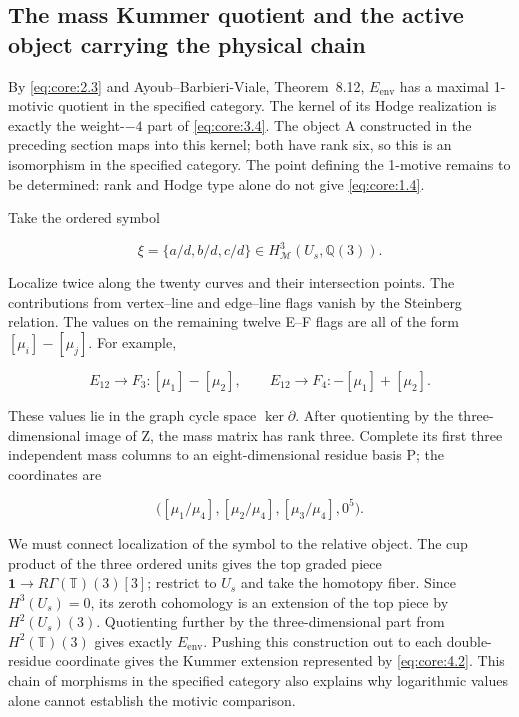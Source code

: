 \documentclass[11pt,a4paper,oneside]{article}
\theoremstyle{plain}
\theoremstyle{definition}
\theoremstyle{remark}
\numberwithin{equation}{section}
\begin{document}
\subsection{The mass Kummer quotient and the active object carrying the physical chain}\label{sec:core:4}

By \eqref{eq:core:2.3} and Ayoub--Barbieri-Viale, Theorem~8.12, \(E_{\mathrm{env}}\) has a maximal 1-motivic quotient in the specified category. The kernel of its Hodge realization is exactly the weight-\(- 4\) part of \eqref{eq:core:3.4}. The object A constructed in the preceding section maps into this kernel; both have rank six, so this is an isomorphism in the specified category. The point defining the 1-motive remains to be determined: rank and Hodge type alone do not give \eqref{eq:core:1.4}.

Take the ordered symbol

\begin{equation}
\xi=\{a/d,b/d,c/d\}\in H^3_{\mathcal M}(U_s,\mathbb Q(3)).
\end{equation}

Localize twice along the twenty curves and their intersection points. The contributions from vertex--line and edge--line flags vanish by the Steinberg relation. The values on the remaining twelve E--F flags are all of the form \([\mu_i]-[\mu_j]\). For example,

\begin{equation}
E_{12}\to F_3:[\mu_1]-[\mu_2],\qquad
 E_{12}\to F_4:-[\mu_1]+[\mu_2].                         \label{eq:core:4.1}
\end{equation}

These values lie in the graph cycle space \(\ker\partial\). After quotienting by the three-dimensional image of Z, the mass matrix has rank three. Complete its first three independent mass columns to an eight-dimensional residue basis P; the coordinates are

\begin{equation}
\bigl([\mu_1/\mu_4],[\mu_2/\mu_4],[\mu_3/\mu_4],0^5\bigr).
                                                               \label{eq:core:4.2}
\end{equation}

We must connect localization of the symbol to the relative object. The cup product of the three ordered units gives the top graded piece \(\mathbf1\to R\Gamma(\mathbb T)(3)[3]\); restrict to \(U_s\) and take the homotopy fiber. Since \(H^3(U_s)=0\), its zeroth cohomology is an extension of the top piece by \(H^2(U_s)(3)\). Quotienting further by the three-dimensional part from \(H^2(\mathbb T)(3)\) gives exactly \(E_{\mathrm{env}}\). Pushing this construction out to each double-residue coordinate gives the Kummer extension represented by \eqref{eq:core:4.2}. This chain of morphisms in the specified category also explains why logarithmic values alone cannot establish the motivic comparison.
\end{document}
